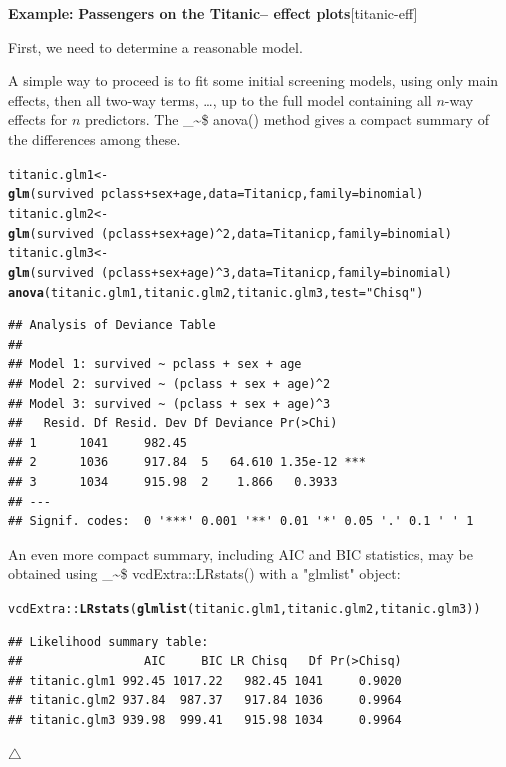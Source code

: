 \documentclass{article}
\makeatletter
\newcommand{\hlnum}[1]{\textcolor[rgb]{0.686,0.059,0.569}{#1}}%
\newcommand{\hlstr}[1]{\textcolor[rgb]{0.192,0.494,0.8}{#1}}%
\newcommand{\hlopt}[1]{\textcolor[rgb]{0,0,0}{#1}}%
\newcommand{\hlstd}[1]{\textcolor[rgb]{0.345,0.345,0.345}{#1}}%
\newcommand{\hlkwb}[1]{\textcolor[rgb]{0.69,0.353,0.396}{#1}}%
\newcommand{\hlkwc}[1]{\textcolor[rgb]{0.333,0.667,0.333}{#1}}%
\newcommand{\hlkwd}[1]{\textcolor[rgb]{0.737,0.353,0.396}{\textbf{#1}}}%
\newenvironment{kframe}{%
 \def\at@end@of@kframe{}%
 \ifinner\ifhmode%
  \def\at@end@of@kframe{\end{minipage}}%
  \begin{minipage}{\columnwidth}%
 \fi\fi%
 \def\FrameCommand##1{\hskip\@totalleftmargin \hskip-\fboxsep
 \colorbox{shadecolor}{##1}\hskip-\fboxsep
     \hskip-\linewidth \hskip-\@totalleftmargin \hskip\columnwidth}%
 \MakeFramed {\advance\hsize-\width
   \@totalleftmargin\z@ \linewidth\hsize
   \@setminipage}}%
 {\par\unskip\endMakeFramed%
 \at@end@of@kframe}
\newenvironment{knitrout}{}{} %
\newcommand{\class}[1]{\textsf{"#1"}}
\newcommand\code{\bgroup\@makeother\_\@makeother\~\@makeother\$\@codex}
\def\@codex#1{{\normalfont\ttfamily\hyphenchar\font=-1 #1}\egroup}
\newcommand{\func}[1]{\code{#1()}}
\newenvironment{Example}[2][unnamed-example]%
  {\medskip\noindent\textbf{\textsf{Example:}}
   \textbf{#2}\hfill [#1]\par\smallskip
  }
  {\hfill $\triangle$}
\makeatother
\begin{document}
\begin{Example}[titanic-eff]{Passengers on the Titanic-- effect plots}
First, we need to determine a reasonable model.

A simple way to proceed is to fit some initial screening models, 
using only main effects, then all two-way terms, \dots, up to the
full model containing all $n$-way effects for $n$ predictors.
The \func{anova} method gives a compact summary of the differences among these.
\begin{knitrout}
\color{fgcolor}\begin{kframe}
\begin{alltt}
\hlstd{titanic.glm1} \hlkwb{<-} \hlkwd{glm}\hlstd{(survived} \hlopt{~} \hlstd{pclass} \hlopt{+} \hlstd{sex} \hlopt{+} \hlstd{age,} \hlkwc{data}\hlstd{=Titanicp,} \hlkwc{family}\hlstd{=binomial)}
\hlstd{titanic.glm2} \hlkwb{<-} \hlkwd{glm}\hlstd{(survived} \hlopt{~} \hlstd{(pclass} \hlopt{+} \hlstd{sex} \hlopt{+} \hlstd{age)}\hlopt{^}\hlnum{2}\hlstd{,} \hlkwc{data}\hlstd{=Titanicp,} \hlkwc{family}\hlstd{=binomial)}
\hlstd{titanic.glm3} \hlkwb{<-} \hlkwd{glm}\hlstd{(survived} \hlopt{~} \hlstd{(pclass} \hlopt{+} \hlstd{sex} \hlopt{+} \hlstd{age)}\hlopt{^}\hlnum{3}\hlstd{,} \hlkwc{data}\hlstd{=Titanicp,} \hlkwc{family}\hlstd{=binomial)}
\hlkwd{anova}\hlstd{(titanic.glm1, titanic.glm2, titanic.glm3,} \hlkwc{test}\hlstd{=}\hlstr{"Chisq"}\hlstd{)}
\end{alltt}
\begin{verbatim}
## Analysis of Deviance Table
## 
## Model 1: survived ~ pclass + sex + age
## Model 2: survived ~ (pclass + sex + age)^2
## Model 3: survived ~ (pclass + sex + age)^3
##   Resid. Df Resid. Dev Df Deviance Pr(>Chi)    
## 1      1041     982.45                         
## 2      1036     917.84  5   64.610 1.35e-12 ***
## 3      1034     915.98  2    1.866   0.3933    
## ---
## Signif. codes:  0 '***' 0.001 '**' 0.01 '*' 0.05 '.' 0.1 ' ' 1
\end{verbatim}
\end{kframe}
\end{knitrout}
An even more compact summary, including AIC and BIC statistics, may be obtained
using \func{vcdExtra::LRstats} with a \class{glmlist} object:
\begin{knitrout}
\color{fgcolor}\begin{kframe}
\begin{alltt}
\hlstd{vcdExtra}\hlopt{::}\hlkwd{LRstats}\hlstd{(}\hlkwd{glmlist}\hlstd{(titanic.glm1, titanic.glm2, titanic.glm3))}
\end{alltt}
\begin{verbatim}
## Likelihood summary table:
##                 AIC     BIC LR Chisq   Df Pr(>Chisq)
## titanic.glm1 992.45 1017.22   982.45 1041     0.9020
## titanic.glm2 937.84  987.37   917.84 1036     0.9964
## titanic.glm3 939.98  999.41   915.98 1034     0.9964
\end{verbatim}
\end{kframe}
\end{knitrout}



\end{Example}
\end{document}
